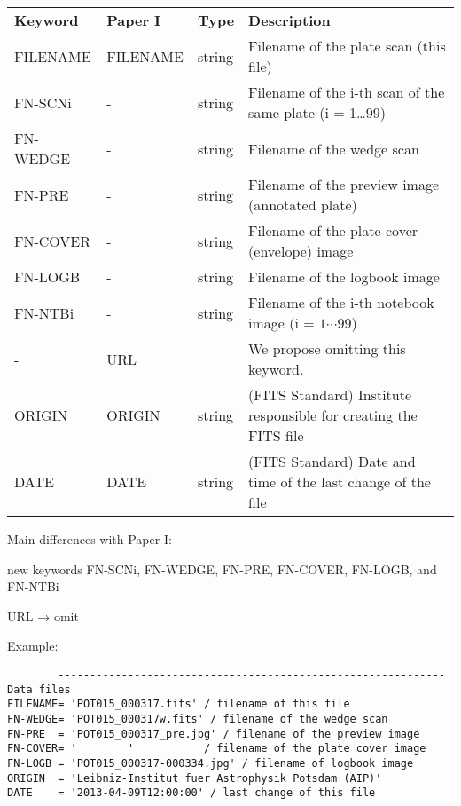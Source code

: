 \documentclass[11pt]{ivoa}
\begin{document}
\begin{inlinetable}
\footnotesize
\begin{tabular}{lllp{}}
\sptablerule
\textbf{Keyword}&\textbf{Paper I}&\textbf{Type}&\textbf{Description}\\
\sptablerule
FILENAME &FILENAME &string    &Filename of the plate scan (this file)\\
FN-SCNi  &-        &string    &
  Filename of the i-th scan of the same plate (i = 1…99)\\
FN-WEDGE &-        &string    &Filename of the wedge scan\\
FN-PRE   &-        &string    &
  Filename of the preview image (annotated plate)\\
FN-COVER &-        &string    &
  Filename of the plate cover (envelope) image\\
FN-LOGB  &-        &string    &Filename of the logbook image\\
FN-NTBi  &-        &string    &
  Filename of the i-th notebook image (i = $1\cdots 99$)\\
-        &URL      &          &We propose omitting this keyword.\\
ORIGIN   &ORIGIN   &string    &
  (FITS Standard) Institute responsible for creating the FITS file\\
DATE     &DATE     &string    &
  (FITS Standard) Date and time of the last change of the file \\
\end{tabular}
\end{inlinetable}

Main differences with Paper I:

new keywords FN-SCNi, FN-WEDGE, FN-PRE, FN-COVER, FN-LOGB, and FN-NTBi

URL → omit

Example:

\begin{lstlisting}
        ------------------------------------------------------------- Data files
FILENAME= 'POT015_000317.fits' / filename of this file
FN-WEDGE= 'POT015_000317w.fits' / filename of the wedge scan
FN-PRE  = 'POT015_000317_pre.jpg' / filename of the preview image
FN-COVER= '        '           / filename of the plate cover image
FN-LOGB = 'POT015_000317-000334.jpg' / filename of logbook image
ORIGIN  = 'Leibniz-Institut fuer Astrophysik Potsdam (AIP)'
DATE    = '2013-04-09T12:00:00' / last change of this file
\end{lstlisting}
\end{document}
